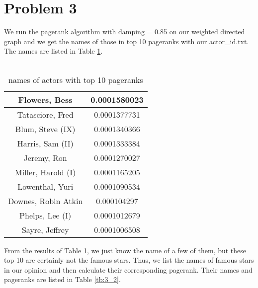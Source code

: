 \documentclass{article}
\begin{document}
\section{Problem 3}
We run the pagerank algorithm with damping = 0.85 on our weighted directed graph and we get the names of those in top 10 pageranks with our actor\_id.txt. The names are listed in Table \ref{tb:3_1}.\\
\\

\begin {table}[htbp]
\caption{names of actors with top 10 pageranks}
\begin{adjustbox}{center}
\label{tb:3_1}
\begin{tabular}{|c|c|}
\hline
Flowers, Bess & 0.0001580023\\
\hline
Tatasciore, Fred & 0.0001377731 \\
\hline
Blum, Steve (IX) & 0.0001340366 \\
\hline
Harris, Sam (II) & 0.0001333384 \\
\hline
Jeremy, Ron & 0.0001270027 \\
\hline
Miller, Harold (I) & 0.0001165205 \\
\hline
Lowenthal, Yuri & 0.0001090534 \\
\hline
Downes, Robin Atkin & 0.000104297  \\
\hline
Phelps, Lee (I) & 0.0001012679  \\
\hline
Sayre, Jeffrey & 0.0001006508  \\
\hline
\end{tabular}
\end{adjustbox}
\end{table}

From the results of Table \ref{tb:3_1}, we just know the name of a few of them, but these top 10  are certainly not the famous stars. Thus, we list the names of famous stars in our opinion and then calculate their corresponding pagerank. Their names and pageranks are listed in Table \ref{tb:3_2}.\\
\\
\end{document}
